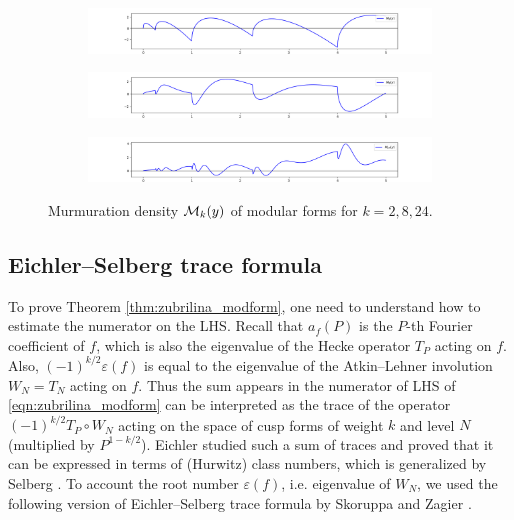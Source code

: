 \begin{figure}[htp] 
\centering
    \begin{subfigure}{1.0\textwidth}
        \centering
        \includegraphics[width=\textwidth]{src/zub_k=2.png}%
        \label{fig:M2}
    \end{subfigure}
    
    \begin{subfigure}{1.0\textwidth}
        \centering
        \includegraphics[width=\textwidth]{src/zub_k=8.png}%
        \label{fig:M8}
    \end{subfigure}

    \begin{subfigure}{1.0\textwidth}
        \centering
        \includegraphics[width=\textwidth]{src/zub_k=24.png}%
        \label{fig:M24}
    \end{subfigure}
    
    \caption{Murmuration density $\mathcal{M}_k(y)$ of modular forms for $k = 2, 8, 24$.}
\label{fig:zub_Mk}
\end{figure}


\subsection{Eichler--Selberg trace formula}

To prove Theorem \ref{thm:zubrilina_modform}, one need to understand how to estimate the numerator on the LHS.
Recall that $a_f(P)$ is the $P$-th Fourier coefficient of $f$, which is also the eigenvalue of the Hecke operator $T_P$ acting on $f$.
Also, $(-1)^{k/2}\varepsilon(f)$ is equal to the eigenvalue of the Atkin--Lehner involution $W_N = T_N$ acting on $f$.
Thus the sum appears in the numerator of LHS of \eqref{eqn:zubrilina_modform} can be interpreted as the trace of the operator $(-1)^{k/2} T_P \circ W_N$ acting on the space of cusp forms of weight $k$ and level $N$ (multiplied by $P^{1 - k/2}$).
Eichler \cite{eichler1955class} studied such a sum of traces and proved that it can be expressed in terms of (Hurwitz) class numbers, which is generalized by Selberg \cite{selberg1956harmonic}.
To account the root number $\varepsilon(f)$, i.e. eigenvalue of $W_N$, we used the following version of Eichler--Selberg trace formula by Skoruppa and Zagier \cite{skoruppa1987jacobi}.

